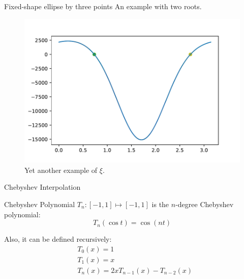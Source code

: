 \documentclass{beamer}
\begin{document}
\begin{frame}{Fixed-shape ellipse by three points}
	An example with two roots.
	\begin{figure}
		\centering
		
		\includegraphics[scale=.5]{012}
		\caption{Yet another example of $\xi$.}
	\end{figure}
\end{frame}

\begin{frame}{Chebyshev Interpolation}
	
	\begin{block}{Chebyshev Polynomial}
		$T_n: [-1, 1] \mapsto [-1, 1]$ is the $n$-degree Chebyshev polynomial:
		\begin{equation*}
		T_n(\cos t) = \cos(nt)
		\end{equation*}
	\end{block}
	Also, it can be defined recursively:	
	\begin{align*}
	&T_0(x) = 1\\
	&T_1(x) = x\\
	&T_n(x) = 2xT_{n-1}(x) - T_{n-2}(x)
	\end{align*}
	
\end{frame}
\end{document}
